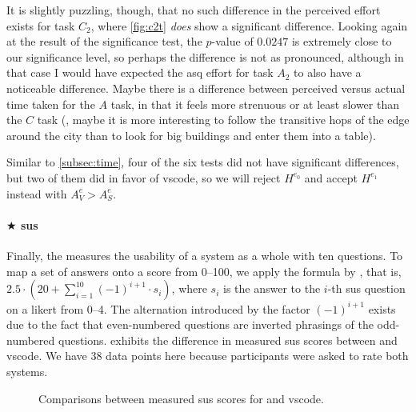 \documentclass[../thesis]{subfiles}
\begin{document}
It is slightly puzzling, though, that no such difference in the perceived effort exists for task $C_2$, where \cref{fig:c2t} \emph{does} show a significant difference.
Looking again at the result of the significance test, the $p$-value of $0.0247$ is extremely close to our significance level, so perhaps the difference is not as pronounced, although in that case I would have expected the \gls{asq} effort for task $A_2$ to also have a noticeable difference.
Maybe there is a difference between perceived versus actual time taken for the $A$ task, in that it feels more strenuous or at least slower than the $C$ task (\eg, maybe it is more interesting to follow the transitive hops of the edge around the city than to look for big buildings and enter them into a table).

Similar to \cref{subsec:time}, four of the six tests did not have significant differences, but two of them did in favor of \gls{vscode}, so we will reject $H^{e_0}$ and accept $H^{e_1}$ instead with $A^e_V > A^e_S$.

\paragraph{$\bigstar$ \gls{sus}}
Finally, the  measures the usability of a system as a whole with ten questions.
To map a set of answers onto a score from 0--100, we apply the formula by \textcite{brooke1996}, that is, $2.5 \cdot (20 + \sum\limits_{i = 1}^{10} (-1)^{i+1} \cdot s_i)$, where $s_i$ is the answer to the $i$-th \gls{sus} question on a \gls{likert} from 0--4.
The alternation introduced by the factor $(-1)^{i+1}$ exists due to the fact that even-numbered questions are inverted phrasings of the odd-numbered questions.
 exhibits the difference in measured \gls{sus} scores between \SEE{} and \gls{vscode}.
We have 38 data points here because participants were asked to rate both systems.

\begin{figure}
	\center
	\violinsus
	\caption{Comparisons between measured \gls{sus} scores for \SEE{} and \gls{vscode}.}\label{fig:sus}
\end{figure}
\end{document}
